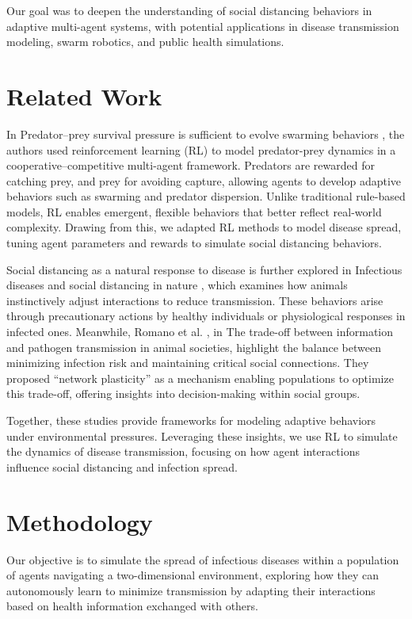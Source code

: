 \documentclass[9pt]{IEEEtran}
\begin{document}
Our goal was to deepen the understanding of social distancing behaviors in adaptive multi-agent systems, with potential applications in disease transmission modeling, swarm robotics, and public health simulations.

\section{Related Work}

In Predator–prey survival pressure is sufficient to evolve swarming behaviors \cite{li2023predator}, the authors used reinforcement learning (RL) to model predator-prey dynamics in a cooperative–competitive multi-agent framework. Predators are rewarded for catching prey, and prey for avoiding capture, allowing agents to develop adaptive behaviors such as swarming and predator dispersion. Unlike traditional rule-based models, RL enables emergent, flexible behaviors that better reflect real-world complexity. Drawing from this, we adapted RL methods to model disease spread, tuning agent parameters and rewards to simulate social distancing behaviors.

Social distancing as a natural response to disease is further explored in Infectious diseases and social distancing in nature \cite{stockmaier2021infectious}, which examines how animals instinctively adjust interactions to reduce transmission. These behaviors arise through precautionary actions by healthy individuals or physiological responses in infected ones. Meanwhile, Romano et al. \cite{romano2022tradeoff}, in The trade-off between information and pathogen transmission in animal societies, highlight the balance between minimizing infection risk and maintaining critical social connections. They proposed “network plasticity” as a mechanism enabling populations to optimize this trade-off, offering insights into decision-making within social groups.

Together, these studies provide frameworks for modeling adaptive behaviors under environmental pressures. Leveraging these insights, we use RL to simulate the dynamics of disease transmission, focusing on how agent interactions influence social distancing and infection spread.

\section{Methodology}

Our objective is to simulate the spread of infectious diseases within a population of agents navigating a two-dimensional environment, exploring how they can autonomously learn to minimize transmission by adapting their interactions based on health information exchanged with others.
\end{document}
